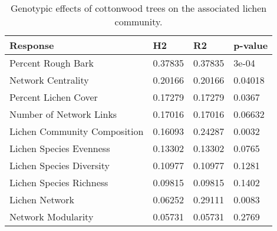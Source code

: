 \begin{table}[ht]
\centering
\begin{tabular}{llll}
  \hline
Response & H2 & R2 & p-value \\ 
  \hline
Percent Rough Bark & 0.37835 & 0.37835 & 3e-04 \\ 
  Network Centrality & 0.20166 & 0.20166 & 0.04018 \\ 
  Percent Lichen Cover & 0.17279 & 0.17279 & 0.0367 \\ 
  Number of Network Links & 0.17016 & 0.17016 & 0.06632 \\ 
  Lichen Community Composition & 0.16093 & 0.24287 & 0.0032 \\ 
  Lichen Species Evenness & 0.13302 & 0.13302 & 0.0765 \\ 
  Lichen Species Diversity & 0.10977 & 0.10977 & 0.1281 \\ 
  Lichen Species Richness & 0.09815 & 0.09815 & 0.1402 \\ 
  Lichen Network & 0.06252 & 0.29111 & 0.0083 \\ 
  Network Modularity & 0.05731 & 0.05731 & 0.2769 \\ 
   \hline
\end{tabular}
\caption{Genotypic effects of cottonwood trees on the associated lichen community.} 
\label{tab:h2_table}
\end{table}
